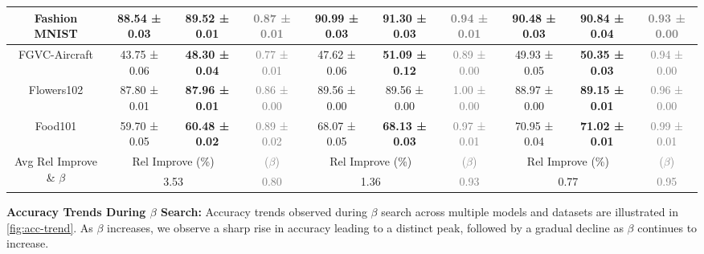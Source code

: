 \begin{table*}[h]
\begin{center}
\begin{small}
{\begin{tabular}{|c|c|c|c|c|c|c|c|c|c|}
Fashion MNIST     & 88.54 ± 0.03 & \textbf{89.52 ± 0.01} & \textcolor{gray}{0.87 ± 0.01} 
                  & 90.99 ± 0.03 & \textbf{91.30 ± 0.03} & \textcolor{gray}{0.94 ± 0.01} 
                  & 90.48 ± 0.03 & \textbf{90.84 ± 0.04} & \textcolor{gray}{0.93 ± 0.00} \\ \hline
FGVC-Aircraft     & 43.75 ± 0.06 & \textbf{48.30 ± 0.04} & \textcolor{gray}{0.77 ± 0.01} 
                  & 47.62 ± 0.06 & \textbf{51.09 ± 0.12} & \textcolor{gray}{0.89 ± 0.00} 
                  & 49.93 ± 0.05 & \textbf{50.35 ± 0.03} & \textcolor{gray}{0.94 ± 0.00} \\ \hline
Flowers102        & 87.80 ± 0.01 & \textbf{87.96 ± 0.01} & \textcolor{gray}{0.86 ± 0.00} 
                  & 89.56 ± 0.00 & 89.56 ± 0.00 & \textcolor{gray}{1.00 ± 0.00} 
                  & 88.97 ± 0.00 & \textbf{89.15 ± 0.01} & \textcolor{gray}{0.96 ± 0.00} \\ \hline
Food101           & 59.70 ± 0.05 & \textbf{60.48 ± 0.02} & \textcolor{gray}{0.89 ± 0.02} 
                  & 68.07 ± 0.05 & \textbf{68.13 ± 0.03} & \textcolor{gray}{0.97 ± 0.01} 
                  & 70.95 ± 0.04 & \textbf{71.02 ± 0.01} & \textcolor{gray}{0.99 ± 0.01} \\ \hline
\multirow{2}{*}{Avg Rel Improve \& $\beta$} & \multicolumn{2}{c|}{Rel Improve (\%)} & \textcolor{gray}{($\beta$)} & \multicolumn{2}{c|}{Rel Improve (\%)} & \textcolor{gray}{($\beta$)} & \multicolumn{2}{c|}{Rel Improve (\%)} & \textcolor{gray}{($\beta$)} \\ \cline{2-10} 
                  & \multicolumn{2}{c|}{3.53} 
                  & \textcolor{gray}{0.80}
                  & \multicolumn{2}{c|}{1.36} 
                  & \textcolor{gray}{0.93}
                  & \multicolumn{2}{c|}{0.77} 
                  & \textcolor{gray}{0.95} \\ \hline
\end{tabular}
}
\end{small}
\end{center}
\vskip -0.1in
\end{table*}

\textbf{Accuracy Trends During $\beta$ Search:}
Accuracy trends observed during $\beta$ search across multiple models and datasets are illustrated in \cref{fig:acc-trend}. As $\beta$ increases, we observe a sharp rise in accuracy leading to a distinct peak, followed by a gradual decline as $\beta$ continues to increase.

